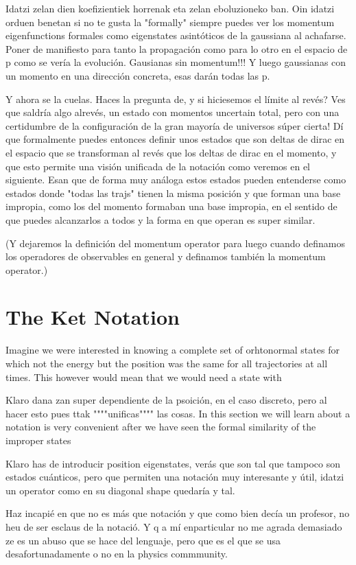 \documentclass[11pt, a4paper]{article} %
\begin{document}
Idatzi zelan dien koefizientiek horrenak eta zelan eboluzioneko ban. Oin idatzi orduen benetan si no te gusta la "formally" siempre puedes ver los momentum eigenfunctions formales como eigenstates asintóticos de la gaussiana al achafarse. Poner de manifiesto para tanto la propagación como para lo otro en el espacio de p como se vería la evolución.  Gausianas sin momentum!!! Y luego gaussianas con un momento en una dirección concreta, esas darán todas las p.

Y ahora se la cuelas. Haces la pregunta de, y si hiciesemos el límite al revés? Ves que saldría algo alrevés, un estado con momentos uncertain total, pero con una certidumbre de la configuración de la gran mayoría de universos súper cierta! Dí que formalmente puedes entonces definir unos estados que son deltas de dirac en el espacio que se transforman al revés que los deltas de dirac en el momento, y que esto permite una visión unificada de la notación como veremos en el siguiente.
Esan que de forma muy análoga estos estados pueden entenderse como estados donde "todas las trajs" tienen la misma posición y que forman una base impropia, como los del momento formaban una base impropia, en el sentido de que puedes alcanzarlos a todos y la forma en que operan es super similar.

(Y dejaremos la definición del momentum operator para luego cuando definamos los operadores de observables en general y definamos también la momentum operator.)

\section*{The Ket Notation }
Imagine we were interested in knowing a complete set of orhtonormal states for which not the energy but the position was the same for all trajectories at all times. This however would mean that we would need a state with 

Klaro dana zan super dependiente de la psoición, en el caso discreto, pero al hacer esto pues ttak """"unificas"""" las cosas.
In this section we will learn about a notation is very convenient after we have seen the formal similarity of the improper states

Klaro has de introducir position eigenstates, verás que son tal que tampoco son estados cuánticos, pero que permiten una notación muy interesante y útil, idatzi un operator como en su diagonal shape quedaría y tal.

Haz incapié en que no es más que notación y que como bien decía un profesor, no heu de ser esclaus de la notació. Y q a mí enparticular no me agrada demasiado ze es un abuso que se hace del lenguaje, pero que es el que se usa desafortunadamente o no en la physics commmunity.
\end{document}
